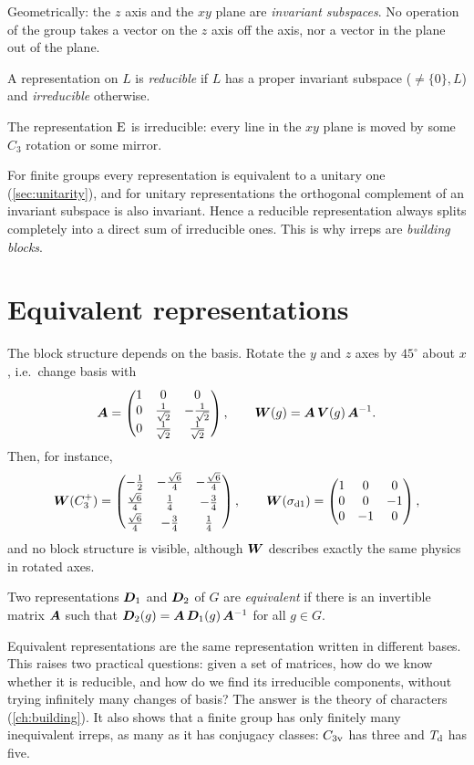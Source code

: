 Geometrically: the $z$ axis and the $xy$ plane are \emph{invariant subspaces}. No
operation of the group takes a vector on the $z$ axis off the axis, nor a vector in
the plane out of the plane.

\begin{definition}
A representation on $L$ is \emph{reducible} if $L$ has a proper invariant subspace
($\neq\{0\},L$) and \emph{irreducible} otherwise.
\end{definition}
The representation $\mathrm{E}$ is irreducible: every line in the $xy$ plane is moved by
some $C_3$ rotation or some mirror.

For finite groups every representation is equivalent to a unitary one
(\cref{sec:unitarity}), and for unitary representations the orthogonal complement of an
invariant subspace is also invariant. Hence a reducible representation always
splits completely into a direct sum of irreducible ones. This is why irreps are
\emph{building blocks}.

\section{Equivalent representations}\label{sec:equiv}

The block structure depends on the basis. Rotate the $y$ and $z$ axes by $45^\circ$
about $x$, i.e.\ change basis with
\[
\bm{A}=\begin{pmatrix}1&0&0\\0&\tfrac{1}{\sqrt2}&-\tfrac{1}{\sqrt2}\\0&\tfrac{1}{\sqrt2}&\tfrac{1}{\sqrt2}\end{pmatrix},
\qquad \bm{W}(g)=\bm{A}\,\bm{V}(g)\,\bm{A}^{-1}.
\]
Then, for instance,
\[
\bm{W}(C_3^+)=\begin{pmatrix}-\frac12&-\frac{\sqrt6}{4}&-\frac{\sqrt6}{4}\\[2pt]
\frac{\sqrt6}{4}&\frac14&-\frac34\\[2pt]\frac{\sqrt6}{4}&-\frac34&\frac14\end{pmatrix},
\qquad
\bm{W}(\sigma_{\mathrm{d}1})=\begin{pmatrix}1&0&0\\0&0&-1\\0&-1&0\end{pmatrix},
\]
and no block structure is visible, although $\bm{W}$ describes exactly the same
physics in rotated axes.

\begin{definition}
Two representations $\bm{D}_1$ and $\bm{D}_2$ of $G$ are \emph{equivalent} if there
is an invertible matrix $\bm{A}$ such that
$\bm{D}_2(g)=\bm{A}\,\bm{D}_1(g)\,\bm{A}^{-1}$ for all $g\in G$.
\end{definition}
Equivalent representations are the same representation written in different bases.
This raises two practical questions: given a set of matrices, how do we know whether
it is reducible, and how do we find its irreducible components, without trying
infinitely many changes of basis? The answer is the theory of characters
(\cref{ch:building}). It also shows that a finite group has only finitely many
inequivalent irreps, as many as it has conjugacy classes: $C_{3\mathrm{v}}$ has three and
$T_{\mathrm{d}}$ has five.

